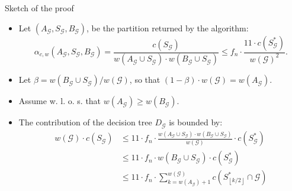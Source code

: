 \documentclass{beamer}
\newcommand{\br}[1]{\mathopen{}\left( #1 \right)}
\newcommand{\fl}[1]{\mathopen{}\left\lfloor #1 \right\rfloor}
\begin{document}
\begin{frame}{Sketch of the proof}
    \begin{itemize}
        \item Let $\br{A_{\mathcal{G}},S_{\mathcal{G}}, B_{\mathcal{G}}}$, be the partition returned by the algorithm:
        $$
        \alpha_{c,w}\br{A_{\mathcal{G}},S_{\mathcal{G}}, B_{\mathcal{G}}}=\frac{c\br{S_{\mathcal{G}}}}{w\br{A_{\mathcal{G}}\cup S_{\mathcal{G}}}\cdot w\br{B_{\mathcal{G}}\cup S_{\mathcal{G}}}}\leq f_n \cdot \frac{11\cdot c\br{S_{\mathcal{G}}^*}} {w\br{\mathcal{G}}^2}.
        $$
        \item Let $\beta=w\br{B_{\mathcal{G}}\cup S_{\mathcal{G}}}/w\br{\mathcal{G}}$, so that $\br{1-\beta}\cdot w\br{\mathcal{G}} = w\br{A_\mathcal{G}}$.
        \item Assume w. l. o. s. that $w\br{A_{\mathcal{G}}}\geq w\br{B_{\mathcal{G}}}$. 
        \pause
        \item The contribution of the decision tree $D_{\mathcal{G}}$ is bounded by:
        \begin{align*}
        w\br{\mathcal{G}}\cdot c\br{S_{\mathcal{G}}} &\leq 11 \cdot f_n\cdot \frac{w\br{A_{\mathcal{G}}\cup S_{\mathcal{G}}}\cdot w\br{B_{\mathcal{G}}\cup S_{\mathcal{G}}}}{w\br{\mathcal{G}}}\cdot c\br{S_{\mathcal{G}}^*}\\
        & \leq 
        11 \cdot f_n\cdot w\br{B_{\mathcal{G}}\cup S_{\mathcal{G}}}\cdot c\br{S_{\mathcal{G}}^*}
        \\ & \leq 
        11 \cdot f_n\cdot \sum_{k=w\br{A_{\mathcal{G}}}+1}^{w\br{\mathcal{G}}}c\br{S_{\fl{k/2}}^*\cap \mathcal{G}}
        \end{align*}
    \end{itemize}
\end{frame}
\end{document}
